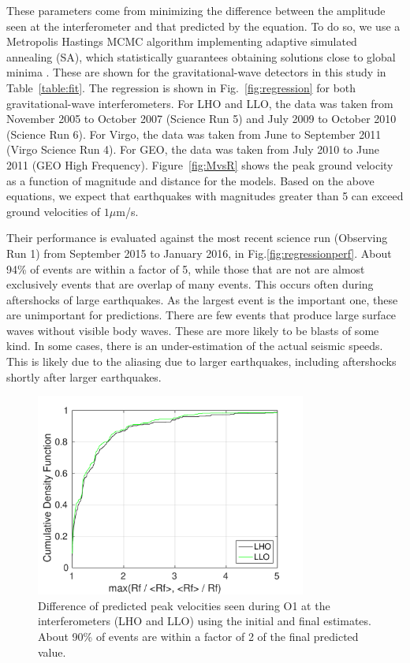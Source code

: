 \documentclass[reprint, prl, aps, showpacs]{revtex4-1}
\begin{document}
These parameters come from minimizing the difference between the amplitude seen at the interferometer and that predicted by the equation. 
To do so, we use a Metropolis Hastings MCMC algorithm implementing adaptive simulated annealing (SA), which statistically guarantees obtaining solutions close to global minima \cite{KiGe1983,In2000}.
These are shown for the gravitational-wave detectors in this study in Table~\ref{table:fit}. The regression is shown in Fig.~\ref{fig:regression} for both gravitational-wave interferometers. 
For LHO and LLO, the data was taken from November 2005 to October 2007 (Science Run 5) and July 2009 to October 2010 (Science Run 6).
For Virgo, the data was taken from June to September 2011 (Virgo Science Run 4).
For GEO, the data was taken from July 2010 to June 2011 (GEO High Frequency).
Figure~\ref{fig:MvsR} shows the peak ground velocity as a function of magnitude and distance for the models. Based on the above equations, we expect that earthquakes with magnitudes greater than 5 can exceed ground velocities of $1 \mu$m/s.

Their performance is evaluated against the most recent science run (Observing Run 1) from September 2015 to January 2016, in Fig.\ref{fig:regressionperf}. About 94\% of events are within a factor of 5, while those that are not are almost exclusively events that are overlap of many events. This occurs often during aftershocks of large earthquakes. As the largest event is the important one, these are unimportant for predictions. There are few events that produce large surface waves without visible body waves. These are more likely to be blasts of some kind.
In some cases, there is an under-estimation of the actual seismic speeds.
This is likely due to the aliasing due to larger earthquakes, including aftershocks shortly after larger earthquakes.

\begin{figure}[t]
\hspace*{-0.5cm}
 \includegraphics[width=3.5in]{initial_vs_final.pdf}
 \caption{Difference of predicted peak velocities seen during O1 at the interferometers (LHO and LLO) using the initial and final estimates. About 90\% of events are within a factor of 2 of the final predicted value.}
 \label{fig:initialvsfinal}
\end{figure}
\end{document}
